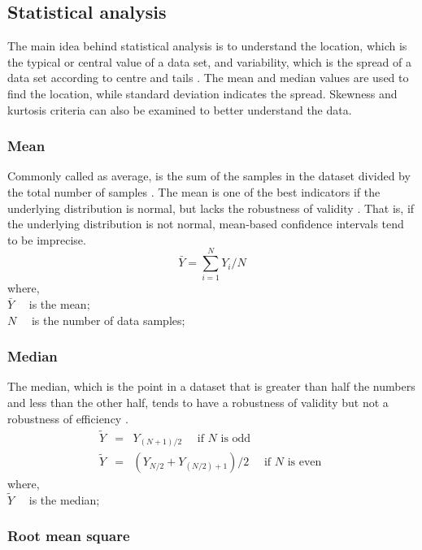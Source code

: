 \subsection{Statistical analysis}

The main idea behind statistical analysis is to understand the location, which is the typical or central value of a data set, and variability, which is the spread of a data set according to centre and tails \cite{croarkin2012handbook}. The mean and median values are used to find the location, while standard deviation indicates the spread. Skewness and kurtosis criteria can also be examined to better understand the data. 

\subsubsection{Mean}

Commonly called as average, is the sum of the samples in the dataset divided by the total number of samples \cite{shukla2015analysis}. The mean is one of the best indicators if the underlying distribution is normal, but lacks the robustness of validity \cite{croarkin2012handbook}. That is, if the underlying distribution is not normal, mean-based confidence intervals tend to be imprecise.
\begin{equation}
\bar{Y}=\sum_{i=1}^{N} Y_{i} / N
\label{mean}
\end{equation}
where,\\
$\bar{Y} \quad$ is the mean;\\
$N \quad$ is the number of data samples;
\pagebreak
\subsubsection{Median}

The median, which is the point in a dataset that is greater than half the numbers and less than the other half, tends to have a robustness of validity but not a robustness of efficiency \cite{croarkin2012handbook,shukla2015analysis}.
\begin{eqnarray}
\tilde{Y} &=& Y_{(N+1) / 2} \quad \text { if } N \text { is odd }\\
\tilde{Y} &=& \left(Y_{N / 2}+Y_{(N / 2)+1}\right) / 2 \quad \text { if } N \text { is even }
\label{median}
\end{eqnarray}
where,\\
$\tilde{Y} \quad$ is the median;
\subsubsection{Root mean square}

